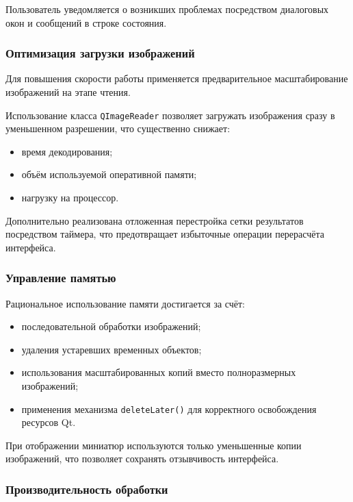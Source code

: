 Пользователь уведомляется о возникших проблемах посредством диалоговых окон и сообщений в строке состояния.

\subsubsection{Оптимизация загрузки изображений}

Для повышения скорости работы применяется предварительное масштабирование изображений на этапе чтения.

Использование класса \texttt{QImageReader} позволяет загружать изображения сразу в уменьшенном разрешении, что существенно снижает:

\begin{itemize}
	\item время декодирования;
	\item объём используемой оперативной памяти;
	\item нагрузку на процессор.
\end{itemize}

Дополнительно реализована отложенная перестройка сетки результатов посредством таймера, что предотвращает избыточные операции перерасчёта интерфейса.

\subsubsection{Управление памятью}

Рациональное использование памяти достигается за счёт:

\begin{itemize}
	\item последовательной обработки изображений;
	\item удаления устаревших временных объектов;
	\item использования масштабированных копий вместо полноразмерных изображений;
	\item применения механизма \texttt{deleteLater()} для корректного освобождения ресурсов Qt.
\end{itemize}

При отображении миниатюр используются только уменьшенные копии изображений, что позволяет сохранять отзывчивость интерфейса.

\subsubsection{Производительность обработки}

